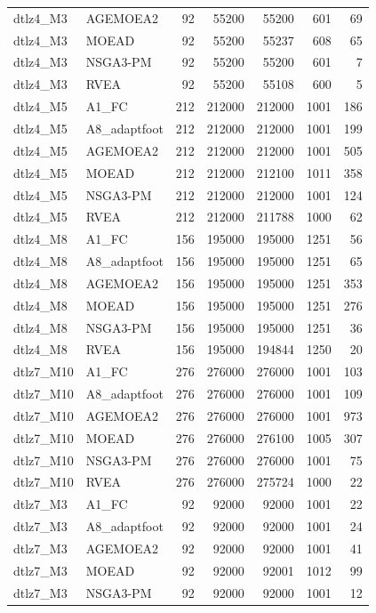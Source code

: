 \begin{tabular}{llrrrrr}
dtlz4_M3 & AGEMOEA2 & 92 & 55200 & 55200 & 601 & 69 \\
dtlz4_M3 & MOEAD & 92 & 55200 & 55237 & 608 & 65 \\
dtlz4_M3 & NSGA3-PM & 92 & 55200 & 55200 & 601 & 7 \\
dtlz4_M3 & RVEA & 92 & 55200 & 55108 & 600 & 5 \\
dtlz4_M5 & A1_FC & 212 & 212000 & 212000 & 1001 & 186 \\
dtlz4_M5 & A8_adaptfoot & 212 & 212000 & 212000 & 1001 & 199 \\
dtlz4_M5 & AGEMOEA2 & 212 & 212000 & 212000 & 1001 & 505 \\
dtlz4_M5 & MOEAD & 212 & 212000 & 212100 & 1011 & 358 \\
dtlz4_M5 & NSGA3-PM & 212 & 212000 & 212000 & 1001 & 124 \\
dtlz4_M5 & RVEA & 212 & 212000 & 211788 & 1000 & 62 \\
dtlz4_M8 & A1_FC & 156 & 195000 & 195000 & 1251 & 56 \\
dtlz4_M8 & A8_adaptfoot & 156 & 195000 & 195000 & 1251 & 65 \\
dtlz4_M8 & AGEMOEA2 & 156 & 195000 & 195000 & 1251 & 353 \\
dtlz4_M8 & MOEAD & 156 & 195000 & 195000 & 1251 & 276 \\
dtlz4_M8 & NSGA3-PM & 156 & 195000 & 195000 & 1251 & 36 \\
dtlz4_M8 & RVEA & 156 & 195000 & 194844 & 1250 & 20 \\
dtlz7_M10 & A1_FC & 276 & 276000 & 276000 & 1001 & 103 \\
dtlz7_M10 & A8_adaptfoot & 276 & 276000 & 276000 & 1001 & 109 \\
dtlz7_M10 & AGEMOEA2 & 276 & 276000 & 276000 & 1001 & 973 \\
dtlz7_M10 & MOEAD & 276 & 276000 & 276100 & 1005 & 307 \\
dtlz7_M10 & NSGA3-PM & 276 & 276000 & 276000 & 1001 & 75 \\
dtlz7_M10 & RVEA & 276 & 276000 & 275724 & 1000 & 22 \\
dtlz7_M3 & A1_FC & 92 & 92000 & 92000 & 1001 & 22 \\
dtlz7_M3 & A8_adaptfoot & 92 & 92000 & 92000 & 1001 & 24 \\
dtlz7_M3 & AGEMOEA2 & 92 & 92000 & 92000 & 1001 & 41 \\
dtlz7_M3 & MOEAD & 92 & 92000 & 92001 & 1012 & 99 \\
dtlz7_M3 & NSGA3-PM & 92 & 92000 & 92000 & 1001 & 12 \\

\end{tabular}
